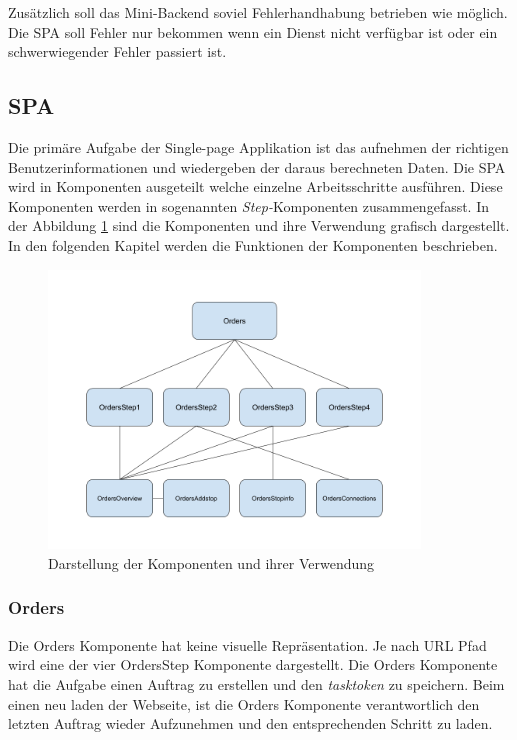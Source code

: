 Zusätzlich soll das Mini-Backend soviel Fehlerhandhabung betrieben wie möglich. Die SPA soll Fehler nur bekommen wenn ein Dienst nicht verfügbar ist oder ein schwerwiegender Fehler passiert ist.

\subsection{SPA}
Die primäre Aufgabe der Single-page Applikation ist das aufnehmen der richtigen Benutzerinformationen und wiedergeben der daraus berechneten Daten. Die SPA wird in Komponenten ausgeteilt welche einzelne Arbeitsschritte ausführen. Diese Komponenten werden in sogenannten \textit{Step-}Komponenten zusammengefasst. In der Abbildung \ref{fig:comparch} sind die Komponenten und ihre Verwendung grafisch dargestellt. In den folgenden Kapitel werden die Funktionen der Komponenten beschrieben.

\begin{figure}[ht]
	\centering
  \includegraphics[width=0.88\textwidth]{images/comparch.png}
	\caption{Darstellung der Komponenten und ihrer Verwendung}
	\label{fig:comparch}
\end{figure}

\subsubsection{Orders}
Die Orders Komponente hat keine visuelle Repräsentation. Je nach URL Pfad wird eine der vier OrdersStep Komponente dargestellt. Die Orders Komponente hat die Aufgabe einen Auftrag zu erstellen und den \textit{tasktoken} zu speichern. Beim einen neu laden der Webseite, ist die Orders Komponente verantwortlich den letzten Auftrag wieder Aufzunehmen und den entsprechenden Schritt zu laden.


